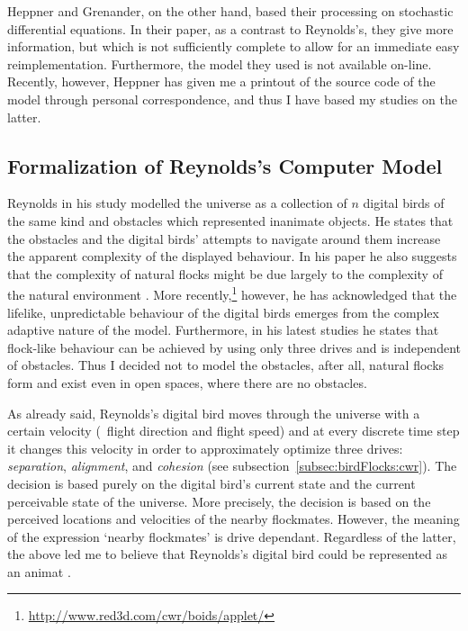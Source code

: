 Heppner and Grenander, on the other hand, based their processing on stochastic differential equations. In their paper, as a contrast to Reynolds's, they give more information, but which is not sufficiently complete to allow for an immediate easy reimplementation. Furthermore, the model they used is not available on-line. Recently, however, Heppner has given me a printout of the source code of the model through personal correspondence, and thus I have based my studies on the latter.

\subsection{Formalization of Reynolds's Computer Model}
\label{subsec:animat:cwr}
Reynolds in his study \cite{reynolds:1987} modelled the universe as a collection of $n$ digital birds of the same kind and obstacles which represented inanimate objects. He states that the obstacles and the digital birds' attempts to navigate around them increase the apparent complexity of the displayed behaviour. In his paper he also suggests that the complexity of natural flocks might be due largely to the complexity of the natural environment \cite{reynolds:1987}. More recently,\footnote{\href{http://www.red3d.com/cwr/boids/applet/}{http://www.red3d.com/cwr/boids/applet/}} however, he has acknowledged that the lifelike, unpredictable behaviour of the digital birds emerges from the complex adaptive nature of the model. Furthermore, in his latest studies \cite{reynolds:1999,reynolds:2000} he states that flock-like behaviour can be achieved by using only three drives and is independent of obstacles. Thus I decided not to model the obstacles, after all, natural flocks form and exist even in open spaces, where there are no obstacles.

As already said, Reynolds's digital bird moves through the universe with a certain velocity (\ie\ flight direction and flight speed) and at every discrete time step it changes this velocity in order to approximately optimize three drives: \emph{separation}, \emph{alignment}, and \emph{cohesion} (see subsection~\ref{subsec:birdFlocks:cwr}). The decision is based purely on the digital bird's current state and the current perceivable state of the universe. More precisely, the decision is based on the perceived locations and velocities of the nearby flockmates. However, the meaning of the expression `nearby flockmates' is drive dependant. Regardless of the latter, the above led me to believe that Reynolds's digital bird could be represented as an animat \cite{lebar_bajec:2002,lebar_bajec:2003a,lebar_bajec:2003b}.

